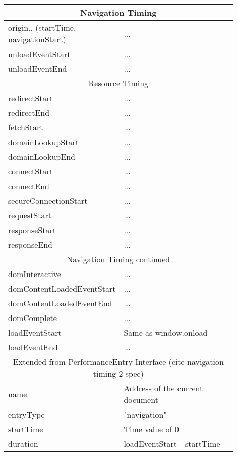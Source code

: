 \begin{center}
	\small
	\begin{longtable}{ | p{0.3\linewidth} | p{0.6\linewidth} | }
	\hline
	\multicolumn{2}{|c|}{Navigation Timing} \\
	\hline
	origin.. (startTime, navigationStart) & ... \\
	\hline
	unloadEventStart & ... \\
	\hline
	unloadEventEnd & ... \\

	\hline
	\multicolumn{2}{|c|}{Resource Timing} \\
	\hline
	redirectStart & ... \\
	\hline
	redirectEnd & ... \\
	\hline
	fetchStart & ... \\
	\hline
	domainLookupStart & ... \\
	\hline
	domainLookupEnd & ... \\
	\hline
	connectStart & ... \\
	\hline
	connectEnd & ... \\
	\hline
	secureConnectionStart & ... \\
	\hline
	requestStart & ... \\
	\hline
	responseStart & ... \\
	\hline
	responseEnd & ... \\
	\hline
	
	\multicolumn{2}{|c|}{Navigation Timing continued} \\
	\hline
	domInteractive & ... \\
	\hline
	domContentLoadedEventStart & ... \\
	\hline
	domContentLoadedEventEnd & ... \\
	\hline
	domComplete & ... \\
	\hline
	loadEventStart & Same as window.onload \\
	\hline
	loadEventEnd & ... \\
	
	\hline
	\multicolumn{2}{|c|}{Extended from PerformanceEntry Interface (cite navigation timing 2 spec)} \\
	\hline
	name & Address of the current document \\
	\hline
	entryType & "navigation" \\
	\hline
	startTime & Time value of 0 \\
	\hline
	duration & loadEventStart - startTime \\


\end{longtable}
\end{center}
